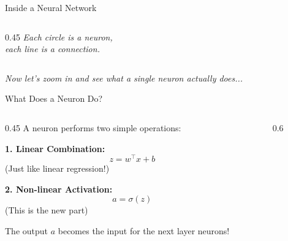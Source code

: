 \begin{frame}{Inside a Neural Network}
\begin{columns}[c]
\begin{column}{0.45\textwidth}
            \vspace{1em}
            \small \textit{Each circle is a neuron,\\each line is a connection.}
        \end{column}
    \end{columns}
    
    \vspace{1em}
    \centering
    \textit{Now let's zoom in and see what a single neuron actually does...}
\end{frame}




\begin{frame}{What Does a Neuron Do?}
    \begin{columns}[c]
        \begin{column}{0.45\textwidth}
            A neuron performs two simple operations:
            
            \vspace{1em}
            \textbf{1. Linear Combination:}
            \[
                z = w^\top x + b
            \]
            \small (Just like linear regression!)
            
            \vspace{1em}
            \textbf{2. Non-linear Activation:}
            \[
                a = \sigma(z)
            \]
            \small (This is the new part)
            
            \vspace{1em}
            \normalsize
            The output $a$ becomes the input for the next layer neurons!
        \end{column}
        
        \begin{column}{0.6\textwidth}
\end{column}
\end{columns}
\end{frame}
